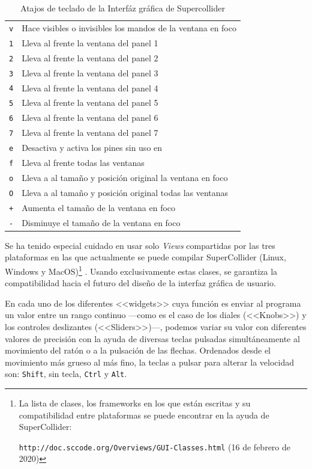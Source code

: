 \begin{table}
	\begin{center}
		\begin{tabular}{ |l|l| }
  		\hline
  		\texttt{v} & Hace visibles o invisibles los mandos de la ventana en foco\\
  		\texttt{1} & Lleva al frente la ventana del panel 1\\
  		\texttt{2} & Lleva al frente la ventana del panel 2\\
  		\texttt{3} & Lleva al frente la ventana del panel 3\\
  		\texttt{4} & Lleva al frente la ventana del panel 4\\
  		\texttt{5} & Lleva al frente la ventana del panel 5\\
  		\texttt{6} & Lleva al frente la ventana del panel 6\\
  		\texttt{7} & Lleva al frente la ventana del panel 7\\
  		\texttt{e} & Desactiva y activa los pines sin uso en \className\\
  		\texttt{f} & Lleva al frente todas las ventanas\\
  		\texttt{o} & Lleva a al tamaño y posición original la ventana en foco\\
  		\texttt{O} & Lleva a al tamaño y posición original todas las ventanas\\
  		\texttt{+} & Aumenta el tamaño de la ventana en foco\\
  		\texttt{-} & Disminuye el tamaño de la ventana en foco\\
  		\hline
		\end{tabular}
		\caption[Atajos de teclado]{Atajos de teclado de la Interfáz gráfica de Supercollider}
		\label{table:atajos}
	\end{center}
\end{table}

Se ha tenido especial cuidado en usar solo \textit{Views} compartidas por las tres plataformas en las que actualmente se puede compilar SuperCollider (Linux, Windows y MacOS)\footnote{La lista de clases, los frameworks en los que están escritas y su compatibilidad entre plataformas se puede encontrar en la ayuda de SuperCollider: 

\texttt{http://doc.sccode.org/Overviews/GUI-Classes.html} (16 de febrero de 2020) } . Usando exclusivamente estas clases, se garantiza la compatibilidad hacia el futuro del diseño de la interfaz gráfica de usuario.

En cada uno de los diferentes <<widgets>> cuya función es enviar al programa un valor entre un rango continuo ---como es el caso de los diales (<<Knobs>>) y los controles deslizantes (<<Sliders>>)---, podemos variar su valor con diferentes valores de precisión con la ayuda de diversas teclas pulsadas simultáneamente al movimiento del ratón o a la pulsación de las flechas. Ordenados desde el movimiento más grueso al más fino, la teclas a pulsar para alterar la velocidad son: \texttt{Shift}, sin tecla, \texttt{Ctrl} y \texttt{Alt}.


